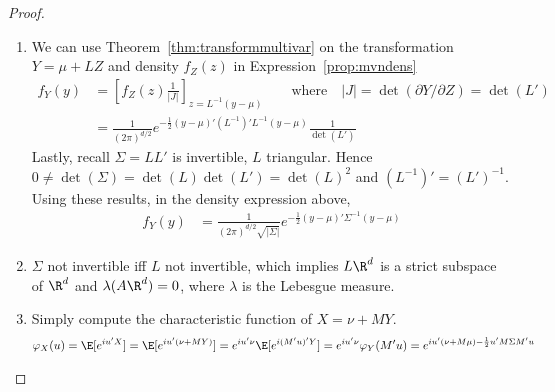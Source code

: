 \documentclass[12pt]{article}
\theoremstyle{plain}
\theoremstyle{definition}
\theoremstyle{remark}
\begin{document}
\begin{proof}
\begin{enumerate}[label=(\roman*)]
  \item
    We can use Theorem~\ref{thm:transformmultivar} on the
    transformation $Y=\mu+LZ$ and density $f_Z(z)$ in
    Expression~\ref{prop:mvndens}
    \begin{align*}
      f_{Y}(y)
      &= \left[
          f_{Z}(z)\frac{1}{\lvert J\rvert}
        \right]_{z=L^{-1}(y-\mu)}
      \qquad\text{where}\quad
      |J|
      = \det\left(\partial Y/\partial Z\right)
      = \det(L')
      \\
      &=
        \frac{1}{(2\pi)^{d/2}}
        e^{-\frac{1}{2}(y-\mu)'(L^{-1})' L^{-1}(y-\mu)}
        \frac{1}{\det(L')}
    \end{align*}
    Lastly, recall $\Sigma=LL'$ is invertible, $L$ triangular.
    Hence $0\neq\det(\Sigma)=\det(L)\det(L')=\det(L)^2$
    and $(L^{-1})'=(L')^{-1}$. Using these results,
    in the density expression above,
    \begin{align*}
      f_{Y}(y)
      &=
      \frac{1}{(2\pi)^{d/2}\sqrt{|\Sigma|}}
      e^{-\frac{1}{2}(y-\mu)'\Sigma^{-1} (y-\mu)}
    \end{align*}
  \item
    $\Sigma$ not invertible iff $L$ not invertible, which implies
    $L\R^d$ is a strict subspace of $\R^d$ and $\lambda(A\R^d)=0$, where
    $\lambda$ is the Lebesgue measure.
  \item
    Simply compute the characteristic function of $X=\nu+MY$.
    \begin{align*}
      \varphi_X(u)
      = \E[e^{iu'X}]
      = \E[e^{iu'(\nu+MY)}]
      = e^{iu'\nu}\E[e^{i(M'u)'Y}]
      = e^{iu'\nu}\varphi_Y(M'u)
      = e^{iu'(\nu+M\mu)-\frac{1}{2}u'M\Sigma M'u}
    \end{align*}
\end{enumerate}
\end{proof}
\end{document}
